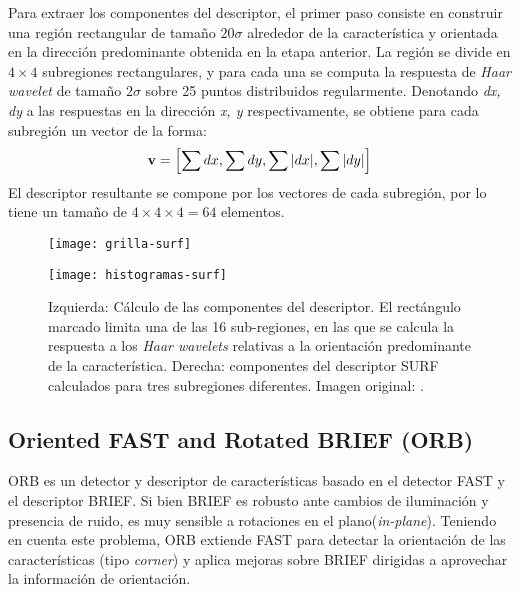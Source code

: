 Para extraer los componentes del descriptor, el primer paso consiste en construir una región rectangular de tamaño $20\sigma$ alrededor de la característica y orientada en la dirección predominante obtenida en la etapa anterior. La región se divide en $4 \times 4$ subregiones rectangulares, y para cada una se computa la respuesta de \textit{Haar wavelet} de tamaño $2\sigma$ sobre 25 puntos distribuidos regularmente. Denotando \textit{dx, dy} a las respuestas en la dirección \textit{x, y} respectivamente, se obtiene para cada subregión un vector de la forma:
\begin{equation}
\textbf{v} = \left[\sum{dx}, \sum{dy}, \sum{\lvert dx\rvert}, \sum{\lvert dy\rvert}\right]
\end{equation}
El descriptor resultante se compone por los vectores de cada subregión, por lo tiene un tamaño de $ 4 \times 4 \times 4 = 64 $ elementos.

\begin{figure}[ht]
\centering
\begin{minipage}[h]{.45\textwidth}
\begin{center}
\texttt{[image: grilla-surf]}
\end{center}
\end{minipage}
\hfill
\begin{minipage}[h]{.45\textwidth}
\begin{center}
\texttt{[image: histogramas-surf]}
\end{center}
\end{minipage}
\hfill
\caption[Componentes del descriptor SURF]
{Izquierda: Cálculo de las componentes del descriptor. El rectángulo marcado limita una de las 16 sub-regiones, en las que se calcula la respuesta a los \textit{Haar wavelets} relativas a la orientación predominante de la característica. Derecha: componentes del descriptor SURF calculados para tres subregiones diferentes. Imagen original: \cite{bay2008speeded}.}
\label{fig:componentes-descriptor-surf}
\end{figure}

\subsection{Oriented FAST and Rotated BRIEF (ORB)}

ORB\cite{RubleeRKB11} es un detector y descriptor de características basado en el detector FAST\cite{Rosten06machinelearning} y el descriptor BRIEF\cite{Calonder12}. Si bien BRIEF es robusto ante cambios de iluminación y presencia de ruido, es muy sensible a rotaciones en el plano(\textit{in-plane}). Teniendo en cuenta este problema, ORB extiende FAST para detectar la orientación de las características (tipo \textit{corner}) y aplica mejoras sobre BRIEF dirigidas a aprovechar la información de orientación.


